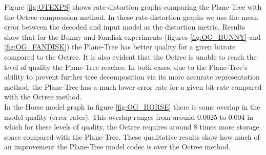 Figure \ref{fig:OTEXPS} shows rate-distortion graphs comparing the Plane-Tree with the Octree compression method. In these rate-distortion graphs we use the mean error between the decoded and input model as the distortion metric. Results show that for the Bunny and Fandisk experiments (figures \ref{fig:OG_BUNNY} and \ref{fig:OG_FANDISK}) the Plane-Tree has better quality for a given bitrate compared to the Octree. It is also evident that the Octree is unable to reach the level of quality the Plane-Tree reaches. In both cases, due to the Plane-Tree's ability to prevent further tree decomposition via its more accurate representation method, the Plane-Tree has a much lower error rate for a given bit-rate compared with the Octree method. \\

In the Horse model graph in figure \ref{fig:OG_HORSE} there is some overlap in the model quality (error rates). This overlap ranges from around $0.0025$ to $0.004$ in which for these levels of quality, the Octree requires around 8 times more storage space compared with the Plane-Tree. These qualitative results show how much of an improvement the Plane-Tree model codec is over the Octree method. \\

